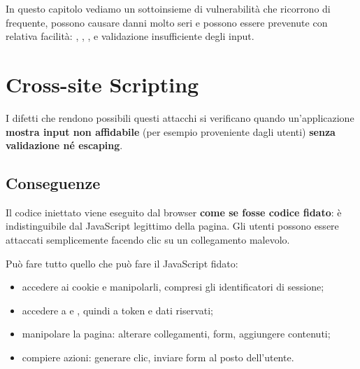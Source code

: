 
In questo capitolo vediamo un sottoinsieme di vulnerabilità che ricorrono di
frequente, possono causare danni molto seri e possono essere prevenute con
relativa facilità: , , ,  e validazione
insufficiente degli input.

\section{Cross-site Scripting}


I difetti che rendono possibili questi attacchi si verificano quando
un'applicazione \textbf{mostra input non affidabile} (per esempio proveniente
dagli utenti) \textbf{senza validazione né escaping}.

\subsection{Conseguenze}

Il codice iniettato viene eseguito dal browser \textbf{come se fosse codice
fidato}: è indistinguibile dal JavaScript legittimo della pagina. Gli utenti
possono essere attaccati semplicemente facendo clic su un collegamento
malevolo.

Può fare tutto quello che può fare il JavaScript fidato:

\begin{itemize}
  \item accedere ai cookie e manipolarli, compresi gli identificatori di
        sessione;
  \item accedere a  e , quindi a token
        e dati riservati;
  \item manipolare la pagina: alterare collegamenti, form, aggiungere contenuti;
  \item compiere azioni: generare clic, inviare form al posto dell'utente.
\end{itemize}

